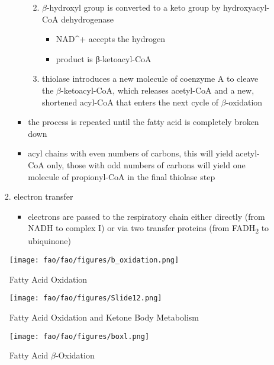 \documentclass{scrartcl}
\begin{document}
\begin{enumerate}
\begin{itemize}
\begin{enumerate}
\begin{itemize}
\begin{enumerate}
\begin{itemize}
\end{itemize}
\item \(\beta\)-hydroxyl group is converted to a keto group by
hydroxyacyl-CoA dehydrogenase
\begin{itemize}
\item NAD\^{}+ accepts the hydrogen
\item product is β-ketoacyl-CoA
\end{itemize}
\item thiolase introduces a new molecule of coenzyme A to cleave
the \(\beta\)-ketoacyl-CoA, which releases acetyl-CoA and a new,
shortened acyl-CoA that enters the next cycle of
\(\beta\)-oxidation
\end{enumerate}
\item the process is repeated until the fatty acid is completely
broken down
\item acyl chains with even numbers of carbons, this will yield
acetyl-CoA only, those with odd numbers of carbons will yield
one molecule of propionyl-CoA in the final thiolase step
\end{itemize}
\item electron transfer
\begin{itemize}
\item electrons are passed to the respiratory chain either directly
(from NADH to complex I) or via two transfer proteins (from
FADH\textsubscript{2} to ubiquinone)
\end{itemize}
\end{enumerate}
\end{itemize}

\begin{figure}[htbp]
\centering
\texttt{[image: fao/fao/figures/b\_oxidation.png]}
\caption{\label{fig:org622d57d}Fatty Acid Oxidation}
\end{figure}

\begin{figure}[htbp]
\centering
\texttt{[image: fao/fao/figures/Slide12.png]}
\caption{\label{fig:org21815a8}Fatty Acid Oxidation and Ketone Body Metabolism}
\end{figure}


\begin{figure}[htbp]
\centering
\texttt{[image: fao/fao/figures/boxl.png]}
\caption{\label{fig:orgdab469e}Fatty Acid \(\beta\)-Oxidation}
\end{figure}





\end{enumerate}
\end{document}
